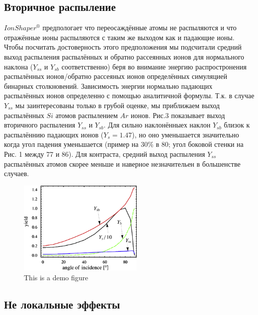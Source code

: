 \documentclass[a4paper,fontsize=12pt]{article}
\begin{document}
\subsection{Вторичное распыление}

$IonShaper^{®}$ предпологает что переосаждённые атомы не распыляются и что отражённые ионы распыляются с таким же выходом как и падающие ионы. Чтобы посчитать достоверность этого предположения мы подсчитали средний выход распыления распылённых и обратно рассеянных ионов для нормального наклона ($Y_{ss}$ и $Y_{sb}$ соответственно) беря во внимание энергию распростронения распылённых ионов/обратно рассеяных ионов определённых симуляцией бинарных столкновений. Зависимость энергии нормально падающих распылённых ионов определенно с помощью аналитичной формулы. Т.к. в случае $Y_{ss}$ мы заинтересованы только в грубой оценке, мы приближаем выход распылённых $Si$ атомов распылением $Ar$ ионов.
Рис.3 показывает выход вторичного распыления $Y_{ss}$ и $Y_{sb}$. Для сильно наклонённыех наклон $Y_{sb}$ близок к распылённию падающих ионов
($Y_{s} = 1.47$),
но оно уменьшается значительно когда угол падения уменьшается (пример на 30\% в 80; угол боковой стенки на Рис. 1 между 77 и 86). Для контраста, средний выход распыления $Y_{ss}$ распылённых атомов скорее меньше и наверное незначительен в большенстве случаев.


\begin{figure}[h]
    \centering
    \includegraphics[width=6cm]{images/3.eps}
    \caption{This is a demo figure}
    \label{fig:demo1}
\end{figure}

\subsection{Не локальные эффекты}
\end{document}
